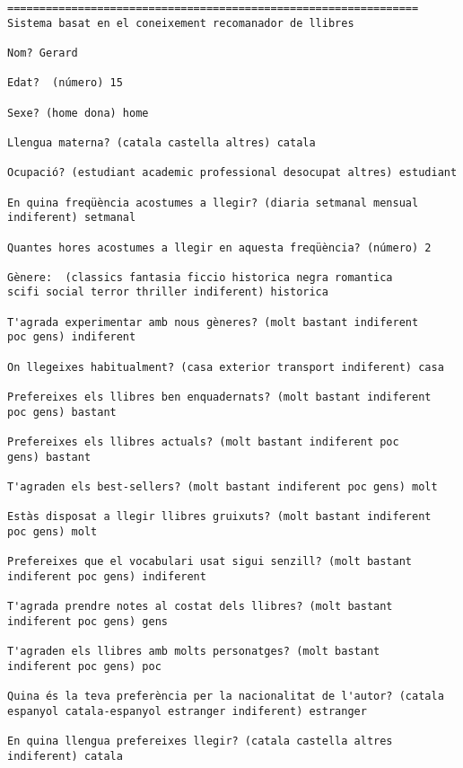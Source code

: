 \begin{verbatim}
================================================================
Sistema basat en el coneixement recomanador de llibres

Nom? Gerard

Edat?  (número) 15

Sexe? (home dona) home

Llengua materna? (catala castella altres) catala

Ocupació? (estudiant academic professional desocupat altres) estudiant

En quina freqüència acostumes a llegir? (diaria setmanal mensual
indiferent) setmanal

Quantes hores acostumes a llegir en aquesta freqüència? (número) 2

Gènere:  (classics fantasia ficcio historica negra romantica
scifi social terror thriller indiferent) historica

T'agrada experimentar amb nous gèneres? (molt bastant indiferent
poc gens) indiferent

On llegeixes habitualment? (casa exterior transport indiferent) casa

Prefereixes els llibres ben enquadernats? (molt bastant indiferent
poc gens) bastant

Prefereixes els llibres actuals? (molt bastant indiferent poc
gens) bastant

T'agraden els best-sellers? (molt bastant indiferent poc gens) molt

Estàs disposat a llegir llibres gruixuts? (molt bastant indiferent
poc gens) molt

Prefereixes que el vocabulari usat sigui senzill? (molt bastant
indiferent poc gens) indiferent

T'agrada prendre notes al costat dels llibres? (molt bastant
indiferent poc gens) gens

T'agraden els llibres amb molts personatges? (molt bastant
indiferent poc gens) poc

Quina és la teva preferència per la nacionalitat de l'autor? (catala
espanyol catala-espanyol estranger indiferent) estranger

En quina llengua prefereixes llegir? (catala castella altres
indiferent) catala


\end{verbatim}
